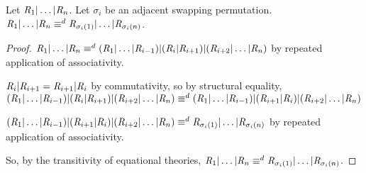 \documentclass[numbers,10pt,preprint\ifanon ,nocopyrightspace\fi]{sigplanconf}
\begin{document}
\begin{lemma}
  \label{lem:adj-swap-or}
  Let $\mathit{R}_1 | \ldots | \mathit{R}_n$.  Let $\sigma_i$ be an adjacent
  swapping permutation.  $\mathit{R}_1 | \ldots | \mathit{R}_n \equiv^d
  \mathit{R}_{\sigma_i(1)} | \ldots | \mathit{R}_{\sigma_i(n)}$.
\end{lemma}
\begin{proof}
  $\mathit{R}_1 | \ldots | \mathit{R}_n \equiv^d (\mathit{R}_1 | \ldots |
  \mathit{R}_{i-1}) | (\mathit{R}_{i} | \mathit{R}_{i+1}) | (\mathit{R}_{i+2} | \ldots
  | \mathit{R}_n)$ by repeated application of associativity.
  
  $\mathit{R}_i | \mathit{R}_{i+1} = \mathit{R}_{i+1} | \mathit{R}_{i}$ by \OrRegexType
  commutativity, so by \OrRegexType{} structural equality,
  $(\mathit{R}_1 | \ldots |
  \mathit{R}_{i-1}) | (\mathit{R}_{i} | \mathit{R}_{i+1}) | (\mathit{R}_{i+2} | \ldots
  | \mathit{R}_n) \equiv^d
  (\mathit{R}_1 | \ldots |
  \mathit{R}_{i-1}) | (\mathit{R}_{i+1} | \mathit{R}_{i}) | (\mathit{R}_{i+2} | \ldots
  | \mathit{R}_n)$
  
  $(\mathit{R}_1 | \ldots |
  \mathit{R}_{i-1}) | (\mathit{R}_{i+1} | \mathit{R}_{i}) | (\mathit{R}_{i+2} | \ldots
  | \mathit{R}_n) \equiv^d
  \mathit{R}_{\sigma_i(1)} | \ldots | \mathit{R}_{\sigma_i(n)}$ by repeated
  application of associativity.
  
  So, by the transitivity of equational theories,
  $\mathit{R}_1 | \ldots | \mathit{R}_n \equiv^d
  \mathit{R}_{\sigma_i(1)} | \ldots | \mathit{R}_{\sigma_i(n)}$.
\end{proof}
\end{document}
